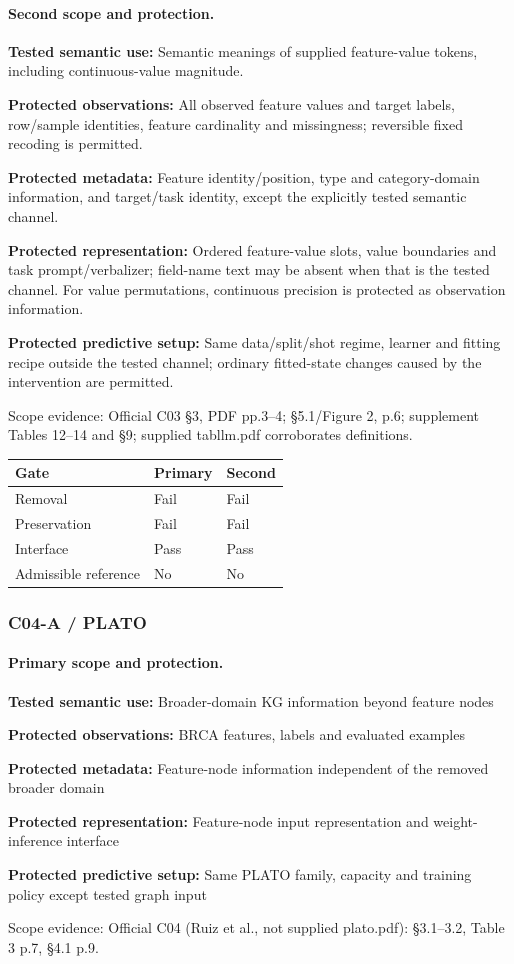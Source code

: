 \documentclass[10pt]{article}
\begin{document}
\paragraph{Second scope and protection.}
\textbf{Tested semantic use:} Semantic meanings of supplied feature-value tokens, including continuous-value magnitude.\par
\textbf{Protected observations:} All observed feature values and target labels, row/sample identities, feature cardinality and missingness; reversible fixed recoding is permitted.\par
\textbf{Protected metadata:} Feature identity/position, type and category-domain information, and target/task identity, except the explicitly tested semantic channel.\par
\textbf{Protected representation:} Ordered feature-value slots, value boundaries and task prompt/verbalizer; field-name text may be absent when that is the tested channel. For value permutations, continuous precision is protected as observation information.\par
\textbf{Protected predictive setup:} Same data/split/shot regime, learner and fitting recipe outside the tested channel; ordinary fitted-state changes caused by the intervention are permitted.\par
Scope evidence: Official C03 §3, PDF pp.3--4; §5.1/Figure 2, p.6; supplement Tables 12--14 and §9; supplied tabllm.pdf corroborates definitions.\par
\begin{tabular}{lll}\toprule Gate & Primary & Second \\ \midrule
Removal & Fail & Fail \\
Preservation & Fail & Fail \\
Interface & Pass & Pass \\
Admissible reference & No & No \\
\bottomrule\end{tabular}
\subsubsection*{C04-A / PLATO}
\paragraph{Primary scope and protection.}
\textbf{Tested semantic use:} Broader-domain KG information beyond feature nodes\par
\textbf{Protected observations:} BRCA features, labels and evaluated examples\par
\textbf{Protected metadata:} Feature-node information independent of the removed broader domain\par
\textbf{Protected representation:} Feature-node input representation and weight-inference interface\par
\textbf{Protected predictive setup:} Same PLATO family, capacity and training policy except tested graph input\par
Scope evidence: Official C04 (Ruiz et al., not supplied plato.pdf): §3.1--3.2, Table 3 p.7, §4.1 p.9.\par
\end{document}
